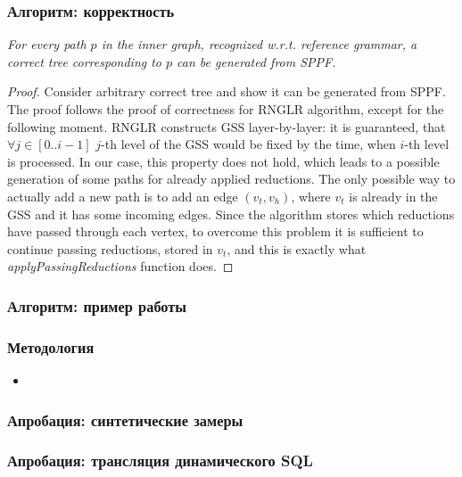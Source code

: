 \documentclass{beamer}
\begin{document}
\begin{frame}
    \transwipe[direction=90]
    \frametitle{Алгоритм: корректность}
    \begin{theorem}
       \textit{For every path $p$ in the inner graph, recognized w.r.t. reference grammar, a correct tree corresponding to $p$ can 
be generated from SPPF.}

    \end{theorem}

    \begin{proof}
Consider arbitrary correct tree and show it can be generated from SPPF. The proof follows the proof of correctness 
for RNGLR algorithm, except for the following moment. RNGLR constructs GSS layer-by-layer: it is guaranteed, that $\forall j \in [0..i-1]$ 
$j$-th level of the GSS would be fixed by the time, when $i$-th level is processed. In our case, 
this property does not hold, which leads to a possible generation of some paths for already applied reductions. 
The only possible way to actually add a new path is to add an edge $(v_{t}, v_{h})$, where $v_{t}$ is already in the GSS and 
it has some incoming edges. Since the algorithm stores which reductions have passed through each vertex, to overcome this problem 
it is sufficient to continue passing reductions, stored in $v_{t}$, and this is exactly what \emph{applyPassingReductions} 
function does. 
    \end{proof}

\end{frame}


\begin{frame}
    \transwipe[direction=90]
    \frametitle{Алгоритм: пример работы}
\end{frame}

\begin{frame}[t]
    \transwipe[direction=90]
    \frametitle{Методология}
    \begin{itemize}
        \item
    \end{itemize}
\end{frame}

\begin{frame}[t]
    \transwipe[direction=90]
    \frametitle{Апробация: синтетические замеры}
\end{frame}

\begin{frame}[t]
    \transwipe[direction=90]
    \frametitle{Апробация: трансляция динамического SQL}
\end{frame}
\end{document}
